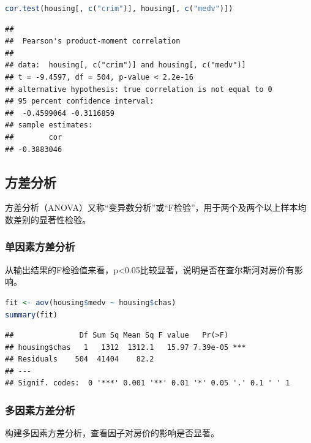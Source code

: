 \documentclass[]{ctexbook}
\begin{document}
\begin{lstlisting}[language=R]
cor.test(housing[, c("crim")], housing[, c("medv")])
\end{lstlisting}

\begin{lstlisting}
## 
##  Pearson's product-moment correlation
## 
## data:  housing[, c("crim")] and housing[, c("medv")]
## t = -9.4597, df = 504, p-value < 2.2e-16
## alternative hypothesis: true correlation is not equal to 0
## 95 percent confidence interval:
##  -0.4599064 -0.3116859
## sample estimates:
##        cor 
## -0.3883046
\end{lstlisting}

\hypertarget{ux65b9ux5deeux5206ux6790}{%
\subsection{方差分析}\label{ux65b9ux5deeux5206ux6790}}

方差分析（ANOVA）又称``变异数分析''或``F检验''，用于两个及两个以上样本均数差别的显著性检验。

\hypertarget{ux5355ux56e0ux7d20ux65b9ux5deeux5206ux6790}{%
\subsubsection{单因素方差分析}\label{ux5355ux56e0ux7d20ux65b9ux5deeux5206ux6790}}

从输出结果的F检验值来看，p\textless0.05比较显著，说明是否在查尔斯河对房价有影响。

\begin{lstlisting}[language=R]
fit <- aov(housing$medv ~ housing$chas)
summary(fit)
\end{lstlisting}

\begin{lstlisting}
##               Df Sum Sq Mean Sq F value   Pr(>F)    
## housing$chas   1   1312  1312.1   15.97 7.39e-05 ***
## Residuals    504  41404    82.2                     
## ---
## Signif. codes:  0 '***' 0.001 '**' 0.01 '*' 0.05 '.' 0.1 ' ' 1
\end{lstlisting}

\hypertarget{ux591aux56e0ux7d20ux65b9ux5deeux5206ux6790}{%
\subsubsection{多因素方差分析}\label{ux591aux56e0ux7d20ux65b9ux5deeux5206ux6790}}

构建多因素方差分析，查看因子对房价的影响是否显著。
\end{document}
